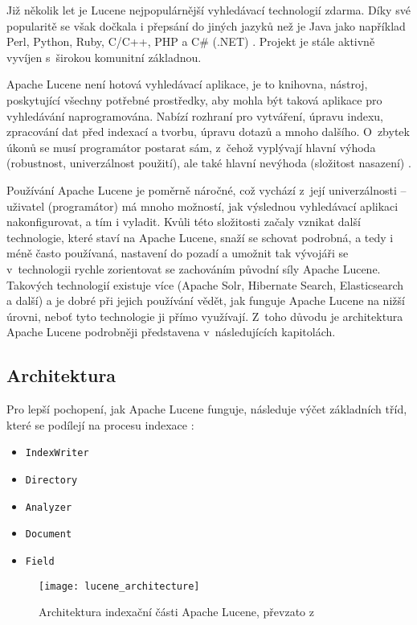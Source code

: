 \documentclass[11pt,oneside]{fithesis2}
\begin{document}
Již několik let je Lucene nejpopulárnější vyhledávací technologií zdarma. Díky své popularitě se však dočkala i přepsání do jiných jazyků než je Java jako například Perl, Python, Ruby, C/C++, PHP a C\# (.NET) \cite[s.~3]{LuceneAction}. Projekt je stále aktivně vyvíjen s~širokou komunitní základnou.

Apache Lucene není hotová vyhledávací aplikace, je to knihovna, nástroj, poskytující všechny potřebné prostředky, aby mohla být taková aplikace pro vyhledávání naprogramována. Nabízí rozhraní pro vytváření, úpravu indexu, zpracování dat před indexací a tvorbu, úpravu dotazů a mnoho dalšího. O~zbytek úkonů se musí programátor postarat sám, z~čehož vyplývají hlavní výhoda (robustnost, univerzálnost použití), ale také hlavní nevýhoda (složitost nasazení) \cite[s.~7]{LuceneAction}.

Používání Apache Lucene je poměrně náročné, což vychází z~její univerzálnosti \cite{ElasticsearchDefinitiveGuide}  -- uživatel (programátor) má mnoho možností, jak výslednou vyhledávací aplikaci nakonfigurovat, a tím i vyladit. Kvůli této složitosti začaly vznikat další technologie, které staví na Apache Lucene, snaží se schovat podrobná, a tedy i méně často používaná, nastavení do pozadí a umožnit tak vývojáři se v~technologii rychle zorientovat se zachováním původní síly Apache Lucene. Takových technologií existuje více (Apache Solr, Hibernate Search, Elasticsearch a další) a je dobré při jejich používání vědět, jak funguje Apache Lucene na nižší úrovni, neboť tyto technologie ji přímo využívají. Z~toho důvodu je architektura Apache Lucene podrobněji představena v~následujících kapitolách.

\subsection{Architektura}
Pro lepší pochopení, jak Apache Lucene funguje, následuje výčet základních tříd, které se podílejí na procesu indexace \cite[s.~26]{LuceneAction}:
\begin{itemize}
	\item \texttt{IndexWriter}
	\item \texttt{Directory}
	\item \texttt{Analyzer}
	\item \texttt{Document}
	\item \texttt{Field}
\end{itemize}

\begin{figure}[htp]
	\begin{center}
		\texttt{[image: lucene\_architecture]}
	\end{center}
	\caption{Architektura indexační části Apache Lucene, převzato z~\cite[s.~26]{LuceneAction}}	
\end{figure}
\end{document}

